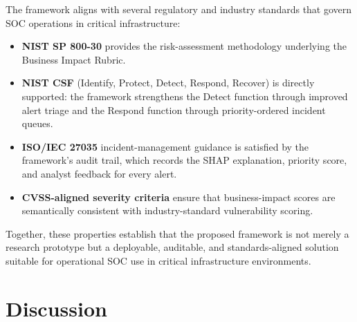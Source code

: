 \documentclass[conference]{IEEEtran}
\begin{document}
The framework aligns with several regulatory and industry standards 
that govern SOC operations in critical infrastructure:

\begin{itemize}
    \item \textbf{NIST SP 800-30} provides the risk-assessment 
    methodology underlying the Business Impact Rubric.
    \item \textbf{NIST CSF} (Identify, Protect, Detect, Respond, 
    Recover) is directly supported: the framework strengthens the 
    Detect function through improved alert triage and the Respond 
    function through priority-ordered incident queues.
    \item \textbf{ISO/IEC 27035} incident-management guidance is 
    satisfied by the framework's audit trail, which records the 
    SHAP explanation, priority score, and analyst feedback for 
    every alert.
    \item \textbf{CVSS-aligned severity criteria} ensure that business-impact scores are semantically consistent with 
    industry-standard vulnerability scoring.
\end{itemize}

Together, these properties establish that the proposed framework is 
not merely a research prototype but a deployable, auditable, and 
standards-aligned solution suitable for operational SOC use in 
critical infrastructure environments.

\section{Discussion}
\end{document}
